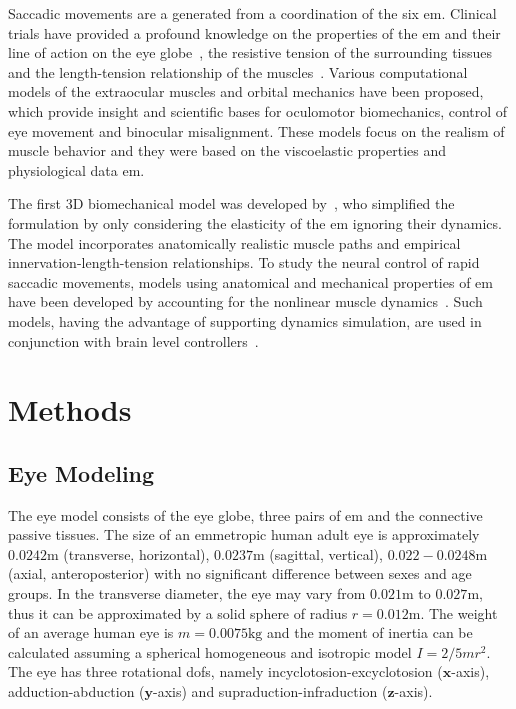 \documentclass[11pt,a4paper,draft=false]{report}
\renewcommand*{\vec}[1]{\bm{#1}}
\begin{document}
Saccadic movements are a generated from a coordination of the six
\gls{em}. Clinical trials have provided a profound knowledge on the properties
of the \gls{em} and their line of action on the eye globe~\cite{Robinson1969a},
the resistive tension of the surrounding tissues~\cite{Collins1981} and the
length-tension relationship of the muscles~\cite{Iskander2018}. Various
computational models of the extraocular muscles and orbital mechanics have been
proposed, which provide insight and scientific bases for oculomotor
biomechanics, control of eye movement and binocular misalignment. These models
focus on the realism of muscle behavior and they were based on the viscoelastic
properties and physiological data \gls{em}.

The first 3D biomechanical model was developed by~\cite{Robinson1964a,
  Robinson1969}, who simplified the formulation by only considering the
elasticity of the \gls{em} ignoring their dynamics. The model incorporates
anatomically realistic muscle paths and empirical innervation-length-tension
relationships. To study the neural control of rapid saccadic movements, models
using anatomical and mechanical properties of \gls{em} have been developed by
accounting for the nonlinear muscle dynamics~\cite{Thelen2003a,
  Millard2013}. Such models, having the advantage of supporting dynamics
simulation, are used in conjunction with brain level
controllers~\cite{James2018}.

\section*{Methods}\label{sec:methods}

\subsection*{Eye Modeling}\label{sec:eye-Modeling}

The eye model consists of the eye globe, three pairs of \gls{em} and the
connective passive tissues. The size of an emmetropic human adult eye is
approximately $0.0242 \si{\m}$ (transverse, horizontal), $0.0237 \si{\m}$
(sagittal, vertical), $0.022 - 0.0248 \si{\m}$ (axial, anteroposterior) with no
significant difference between sexes and age groups. In the transverse diameter,
the eye may vary from $0.021 \si{\m}$ to $0.027 \si{\m}$, thus it can be
approximated by a solid sphere of radius $r = 0.012 \si{\m}$. The weight of an
average human eye is $m = 0.0075 \si{\kg}$ and the moment of inertia can be
calculated assuming a spherical homogeneous and isotropic model
$I = 2 / 5 m r^2$. The eye has three rotational \gls{dofs}, namely
incyclotosion-excyclotosion ($\vec{x}$-axis), adduction-abduction
($\vec{y}$-axis) and supraduction-infraduction ($\vec{z}$-axis).
\end{document}
